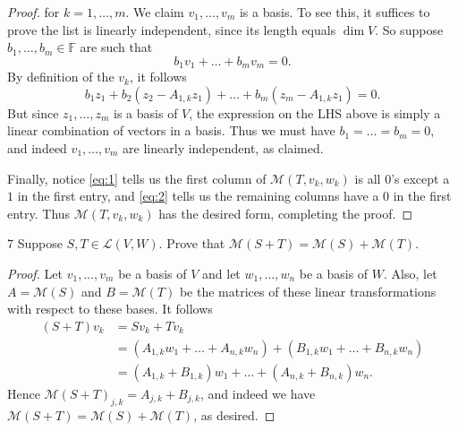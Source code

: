 \documentclass[11pt]{extarticle}
\newenvironment{problem}[1]{\begin{prob*}{#1}{}}{\end{prob*}}
\newcommand{\F}{\mathbb{F}}
\newcommand{\mat}{\mathcal{M}}
\newcommand{\Hom}{\mathcal{L}}
\begin{document}
\begin{proof}
for $k = 1,\dots, m$.  We claim $v_1,\dots,v_m$ is a basis.  To see this, it suffices to prove the list is linearly independent, since its length equals $\dim V$.  So suppose $b_1,\dots, b_m\in\F$ are such that
\begin{equation*}
b_1v_1 + \dots + b_mv_m = 0.
\end{equation*}
By definition of the $v_k$, it follows
\begin{equation*}
b_1z_1 +  b_2(z_2 - A_{1,k}z_1) + \dots + b_m(z_m - A_{1,k}z_1 ) = 0.
\end{equation*}
But since $z_1,\dots, z_m$ is a basis of $V$, the expression on the LHS above is simply a linear combination of vectors in a basis.  Thus we must have $b_1=\dots=b_m=0$, and indeed $v_1,\dots, v_m$ are linearly independent, as claimed.
\par Finally, notice \eqref{eq:1} tells us the first column of $\mat(T, v_k, w_k)$ is all $0$'s except a $1$ in the first entry, and \eqref{eq:2} tells us the remaining columns have a $0$ in the first entry.  Thus $\mat(T, v_k, w_k)$ has the desired form, completing the proof.
\end{proof}

\begin{problem}{7}
Suppose $S,T\in\Hom(V,W)$.  Prove that $\mat(S+T) = \mat(S) + \mat(T)$.  
\end{problem}
\begin{proof}
Let $v_1,\dots, v_m$ be a basis of $V$ and let $w_1,\dots, w_n$ be a basis of $W$.  Also, let $A = \mat(S)$ and $B =\mat(T)$ be the matrices of these linear transformations with respect to these bases.  It follows
\begin{align*}
(S + T)v_k &= Sv_k + Tv_k\\
&= \left(A_{1, k}w_1 + \dots + A_{n,k}w_n\right) + \left(B_{1, k}w_1 + \dots + B_{n,k}w_n\right) \\
&= (A_{1, k} + B_{1,k})w_1 + \dots + (A_{n,k} + B_{n,k})w_n.
\end{align*}
Hence $\mat(S + T)_{j,k}=A_{j,k} + B_{j,k}$, and indeed we have $\mat(S+T) = \mat(S) + \mat(T)$, as desired.
\end{proof}
\end{document}
